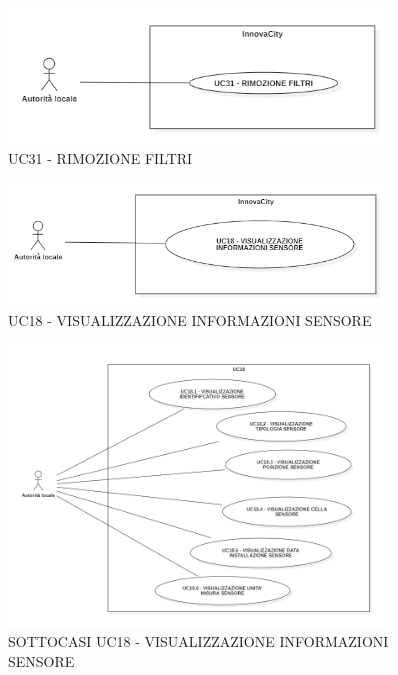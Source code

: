 \begin{figure}[H]
    \centering
    \includegraphics[width=0.9\textwidth]{../Images/uc31.PNG}
    \caption{UC31 - RIMOZIONE FILTRI}
    \label{fig:UC7}
\end{figure}

\begin{figure}[H]
    \centering
    \includegraphics[width=0.9\textwidth]{../Images/uc18.PNG}
    \caption{UC18 - VISUALIZZAZIONE INFORMAZIONI SENSORE}
\end{figure}



\begin{figure}[H]
    \centering
    \includegraphics[width=0.9\textwidth]{../Images/uc18sub.PNG}
    \caption{SOTTOCASI UC18 - VISUALIZZAZIONE INFORMAZIONI SENSORE}
\end{figure}








